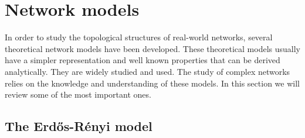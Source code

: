 \documentclass[11 pt , letterpaper , twoside , openright]{book}
\begin{document}
\section{Network models}
\label{netModel}

In order to study the topological structures of real-world networks, several theoretical network models have been developed. These theoretical models usually have a simpler representation and well known properties that can be derived analytically. They are widely studied and used. The study of complex networks relies on the knowledge and understanding of these models. In this section we will review some of the most important ones.

\subsection{The Erd\H{o}s-R\'{e}nyi model}
\end{document}
